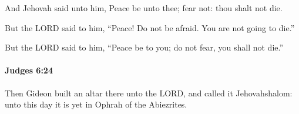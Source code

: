 			\begin{versebox}
					\item[BHS] 
					\item[ASV] And Jehovah said unto him, Peace be unto thee; fear not: thou shalt not die.
					\item[NIV] But the LORD said to him, “Peace! Do not be afraid. You are not going to die.”
					\item[NRSV] But the LORD said to him, “Peace be to you; do not fear, you shall not die.”
			\end{versebox}

		\paragraph{Judges 6:24} %
			\label{JUDGES-6-24}

			Then Gideon built an altar there unto the LORD, and called it Jehovahshalom: unto this day it is yet in Ophrah of the Abiezrites.

